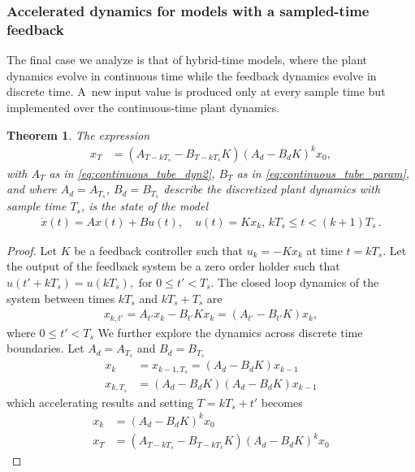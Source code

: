 \documentclass[twocolumn]{autart}    %
\newcommand{\mat}[1]{{#1}}
\renewcommand{\vec}[1]{{#1}}
\newtheorem{theorem}{Theorem}
\newtheorem{proof}{Proof}
\renewcommand{\note}[1]{\textcolor{red}{[#1]}}
\begin{document}
\subsubsection{Accelerated dynamics for models with a sampled-time feedback}\label{sec:real_discrete_feedback_inputs}

The final case we analyze is that of hybrid-time models, where the plant
dynamics evolve in continuous time while the feedback dynamics evolve in
discrete time.  A~new input value is produced only at every sample time but
implemented over the continuous-time plant dynamics.
%
\begin{theorem}
The expression
%
 \begin{align}
 \vec{x}_{T} &= (\mat{A}_{T-kT_s}-\mat{B}_{T-kT_s}\mat{K}) (\mat{A}_d-\mat{B}_d\mat{K})^k\vec{x}_0, 
 \label{eq:cyber_feedback}
 \end{align}
%
with $\mat{A}_T$ as in \eqref{eq:continuous_tube_dyn2}, $\mat{B}_T$ as in
\eqref{eq:continuous_tube_param}, and where $\mat{A}_d=\mat{A}_{T_s}$,
$\mat{B}_d=\mat{B}_{T_s}$ describe the discretized plant dynamics with
sample time $T_s$, is the state of the model
%
\begin{align*}
 \dot{\vec{x}}(t) = \mat{A}\vec{x}(t)+\mat{B}\vec{u}(t), \quad 
 \vec{u}(t)=\mat{K}\vec{x}_k,  \,
 kT_s \leq t < (k+1)T_s \,. 
\end{align*}
%
\end{theorem}
\begin{proof}
%
Let $\mat{K}$ be a feedback controller such that
$\vec{u}_k=-\mat{K}\vec{x}_k$ at time $t=kT_s$.  Let the output of the
feedback system be a zero order holder such that
$\vec{u}(t'+kT_s)=\vec{u}(kT_s), \text{ for } 0 \leq t' < T_s$.  The closed
loop dynamics of the system between times $kT_s$ and $kT_s+T_s$ are
%
\begin{align*}
\vec{x}_{k,t'}=\mat{A}_{t'}\vec{x}_k-\mat{B}_{t'}\mat{K}\vec{x}_k = (\mat{A}_{t'}-\mat{B}_{t'}\mat{K})\vec{x}_k,
\end{align*}
where $0 \leq t' < T_s$
We further explore the dynamics across discrete time boundaries. Let $\mat{A}_d=\mat{A}_{T_s}$ and $\mat{B}_d=\mat{B}_{T_s}$
\begin{align*}
\vec{x}_{k}&=\vec{x}_{k-1,T_s}= (\mat{A}_d-\mat{B}_d\mat{K})\vec{x}_{k-1}\\
\vec{x}_{k,T_s} &= (\mat{A}_d-\mat{B}_d\mat{K}) (\mat{A}_d-\mat{B}_d\mat{K})\vec{x}_{k-1}
\end{align*}
which accelerating results and setting $T=kT_s+t'$ becomes
\begin{align}
\label{eq:feedback_sampled_cont}
\vec{x}_{k} &= (\mat{A}_d-\mat{B}_d\mat{K}) ^k\vec{x}_0\\
\vec{x}_{T} &= (\mat{A}_{T-kT_s}-\mat{B}_{T-kT_s}\mat{K}) (\mat{A}_d-\mat{B}_d\mat{K})^k\vec{x}_0
\label{eq:feedback_cont}
\end{align}
\end{proof}
\end{document}
